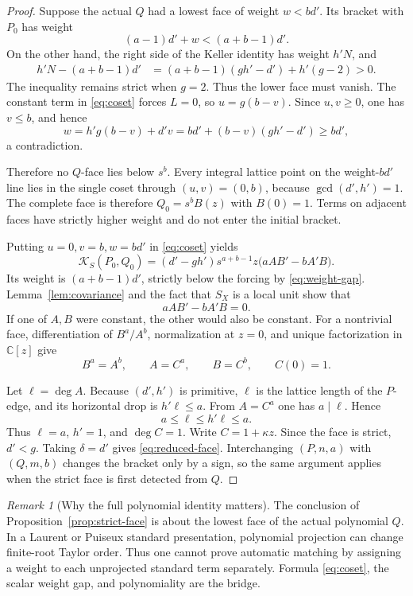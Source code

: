 \documentclass[11pt]{article}
\theoremstyle{definition}
\theoremstyle{remark}
\newtheorem{remark}[theorem]{Remark}
\newcommand{\C}{\mathbb C}
\newcommand{\KS}{\mathcal K_S}
\begin{document}
\begin{proof}
Suppose the actual \(Q\) had a lowest face of weight \(w<bd'\).
Its bracket with \(P_0\) has weight
\[
 (a-1)d'+w<(a+b-1)d'.
\]
On the other hand, the right side of the Keller identity has weight
\(h'N\), and
\begin{align}
 h'N-(a+b-1)d'
 &=(a+b-1)(gh'-d')+h'(g-2)>0.
\label{eq:weight-gap}
\end{align}
The inequality remains strict when \(g=2\).  Thus the lower face must
vanish.  The constant term in \eqref{eq:coset} forces \(L=0\), so
\(u=g(b-v)\).  Since \(u,v\geq0\), one has \(v\leq b\), and hence
\[
 w=h'g(b-v)+d'v
 =bd'+(b-v)(gh'-d')\geq bd',
\]
a contradiction.

Therefore no \(Q\)-face lies below \(s^b\).  Every integral lattice
point on the weight-\(bd'\) line lies in the single coset through
\((u,v)=(0,b)\), because \(\gcd(d',h')=1\).  The complete face is
therefore \(Q_0=s^bB(z)\) with \(B(0)=1\).  Terms on adjacent faces
have strictly higher weight and do not enter the initial bracket.

Putting \(u=0,v=b,w=bd'\) in \eqref{eq:coset} yields
\begin{equation}
 \KS(P_0,Q_0)
 =(d'-gh')s^{a+b-1}z
 \bigl(aAB'-bA'B\bigr).
\label{eq:matched-bracket}
\end{equation}
Its weight is \((a+b-1)d'\), strictly below the forcing by
\eqref{eq:weight-gap}.  Lemma~\ref{lem:covariance} and the fact that
\(S_X\) is a local unit show that
\[
 aAB'-bA'B=0.
\]
If one of \(A,B\) were constant, the other would also be constant.
For a nontrivial face, differentiation of \(B^a/A^b\), normalization
at \(z=0\), and unique factorization in \(\C[z]\) give
\[
 B^a=A^b,\qquad A=C^a,\qquad B=C^b,\qquad C(0)=1.
\]

Let \(\ell=\deg A\).  Because \((d',h')\) is primitive, \(\ell\) is
the lattice length of the \(P\)-edge, and its horizontal drop is
\(h'\ell\leq a\).  From \(A=C^a\) one has \(a\mid\ell\).  Hence
\[
 a\leq\ell\leq h'\ell\leq a.
\]
Thus \(\ell=a\), \(h'=1\), and \(\deg C=1\).  Write
\(C=1+\kappa z\).  Since the face is strict, \(d'<g\).
Taking \(\delta=d'\) gives \eqref{eq:reduced-face}.
Interchanging \((P,n,a)\) with \((Q,m,b)\) changes the bracket only by
a sign, so the same argument applies when the strict face is first
detected from \(Q\).
\end{proof}

\begin{remark}[Why the full polynomial identity matters]
The conclusion of Proposition~\ref{prop:strict-face} is about the
lowest face of the actual polynomial \(Q\).  In a Laurent or Puiseux
standard presentation, polynomial projection can change finite-root
Taylor order.  Thus one cannot prove automatic matching by assigning a
weight to each unprojected standard term separately.  Formula
\eqref{eq:coset}, the scalar weight gap, and polynomiality are the
bridge.
\end{remark}
\end{document}
